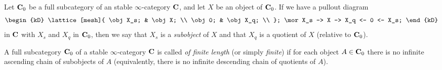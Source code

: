 \begin{definition}
Let $\mathbf{C}_0$ be a full subcategory of an stable $\infty$\hyp{}category $\mathbf{C}$, and let $X$ be an object of $\mathbf{C}_0$. If we have a pullout diagram 
\[
\begin{kD}
\lattice[mesh]{
\obj X_s; & \obj X; \\
\obj 0; & \obj X_q; \\	
};
\mor X_s -> X -> X_q <- 0 <- X_s;
\end{kD}
\]
in $\mathbf{C}$ with $X_s$ and $X_q$ in $\mathbf{C}_0$, then we say that $X_s$ is a \emph{subobject} of $X$ and that $X_q$ is a quotient of $X$ (relative to $\mathbf{C}_0$).
\end{definition}
\begin{definition}\label{artinnoether}
A full subcategory $\mathbf{C}_0$ of a stable $\infty$\hyp{}category $\mathbf{C}$ is called
\emph{of finite length} (or simply \emph{finite}) 
if for each object $A\in\mathbf{C}_0$ there is no infinite ascending chain of subobjects of $A$ (equivalently, there is no infinite descending chain of quotients of $A$).
\end{definition}
